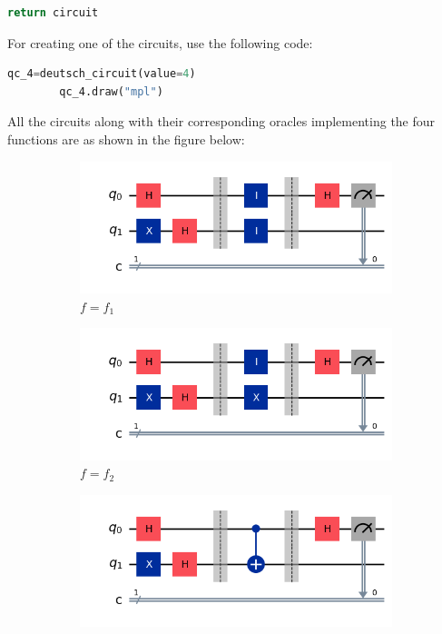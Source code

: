 \documentclass[12pt, oneside]{book}
\theoremstyle{definition}
\theoremstyle{definition}
\theoremstyle{remark}
\begin{document}
\begin{enumerate}
\begin{lstlisting}[language=Python]
    return circuit
    \end{lstlisting}
    For creating one of the circuits, use the following code:
    \begin{lstlisting}[language=Python]
        qc_4=deutsch_circuit(value=4)
        qc_4.draw("mpl")
    \end{lstlisting}
    All the circuits along with their corresponding oracles implementing the four functions are as shown in the figure below:
    \begin{figure}[H]
        \centering
        \begin{subfigure}[b]{0.45\linewidth}
        \centering
        \includegraphics[width=1\linewidth]{../images/deutsch_f1.png}
        \caption{$f=f_1$}
        \label{fig:deutsch_f1}
        \end{subfigure}
        \hfill
        \centering
        \begin{subfigure}[b]{0.45\linewidth}
        \centering
        \includegraphics[width=1\linewidth]{../images/deutsch_f2.png}
        \caption{$f=f_2$}
        \label{fig:deutsch_f2}
        \end{subfigure}
        \vspace{0.5 cm}
        \begin{subfigure}[b]{0.45\linewidth}
        \centering
        \includegraphics[width=1\linewidth]{../images/deutsch_f3.png}

\end{subfigure}
\end{figure}
\end{enumerate}
\end{document}
